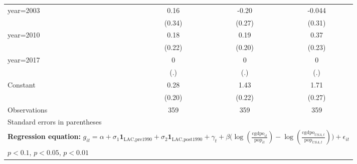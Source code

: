 \begin{table}[htbp]
\begin{tabular}{l*{3}{c}}
year=2003       &     0.16         &    -0.20         &   -0.044         \\
                &   (0.34)         &   (0.27)         &   (0.31)         \\
\addlinespace
year=2010       &     0.18         &     0.19         &     0.37         \\
                &   (0.22)         &   (0.20)         &   (0.23)         \\
\addlinespace
year=2017       &        0         &        0         &        0         \\
                &      (.)         &      (.)         &      (.)         \\
\addlinespace
Constant        &     0.28         &     1.43\sym{***}&     1.71\sym{***}\\
                &   (0.20)         &   (0.22)         &   (0.27)         \\
\midrule
Observations    &      359         &      359         &      359         \\
\bottomrule
\multicolumn{4}{l}{\footnotesize Standard errors in parentheses}\\
\multicolumn{4}{l}{\footnotesize \textbf{Regression equation:} \(g_{it} = \alpha + \sigma_1 \mathbf{1}_{\textrm{LAC,pre1990}} + \sigma_2 \mathbf{1}_{\textrm{LAC,post1990}} + \gamma_t + \beta \big(\log (\frac{\textrm{cgdpo}_{it}}{\textrm{pop}_{it}} ) - \log (\frac{\textrm{cgdpo}_{USA,t}}{\textrm{pop}_{USA,t}}  ) \big) + \epsilon_{it}\)}\\
\multicolumn{4}{l}{\footnotesize \sym{*} \(p<0.1\), \sym{**} \(p<0.05\), \sym{***} \(p<0.01\)}\\
\end{tabular}
\end{table}
